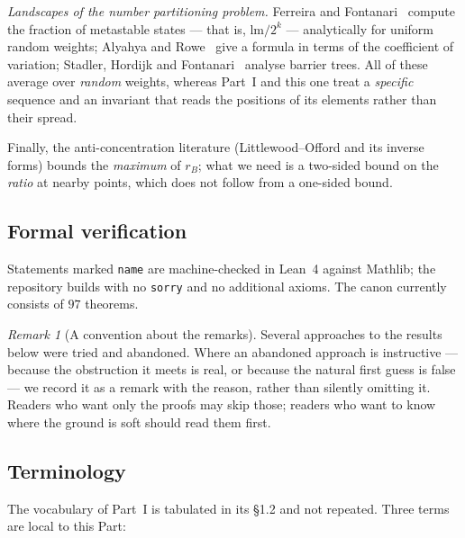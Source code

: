 \documentclass[11pt,a4paper]{article}
\theoremstyle{plain}
\theoremstyle{definition}
\theoremstyle{remark}
\newtheorem{remark}[theorem]{Remark}
\newcommand{\Lean}[1]{\texttt{#1}}
\begin{document}
\emph{Landscapes of the number partitioning problem.} Ferreira and
Fontanari~\cite{FF98} compute the fraction of metastable states --- that is,
$\mathrm{lm}/2^{k}$ --- analytically for uniform random weights; Alyahya and
Rowe~\cite{AR14} give a formula in terms of the coefficient of variation;
Stadler, Hordijk and Fontanari~\cite{SHF03} analyse barrier trees. All of these
average over \emph{random} weights, whereas Part~I and this one
treat a \emph{specific} sequence and an invariant that reads the positions of its
elements rather than their spread.

Finally, the anti-concentration literature (Littlewood--Offord and its inverse
forms) bounds the \emph{maximum} of $r_B$; what we need is a two-sided bound on
the \emph{ratio} at nearby points, which does not follow from a one-sided bound.

\subsection{Formal verification}

Statements marked \Lean{name} are machine-checked in Lean~4 against
Mathlib; the repository builds with no \texttt{sorry} and no additional axioms.
The canon currently consists of $97$ theorems.

\begin{remark}[A convention about the remarks]
Several approaches to the results below were tried and abandoned. Where an
abandoned approach is instructive --- because the obstruction it meets is real,
or because the natural first guess is false --- we record it as a remark with
the reason, rather than silently omitting it. Readers who want only the proofs
may skip those; readers who want to know where the ground is soft should read
them first.
\end{remark}

\subsection{Terminology}\label{sec:terminology2}

The vocabulary of Part~I is tabulated in its \S1.2 and not repeated. Three terms
are local to this Part:
\end{document}

